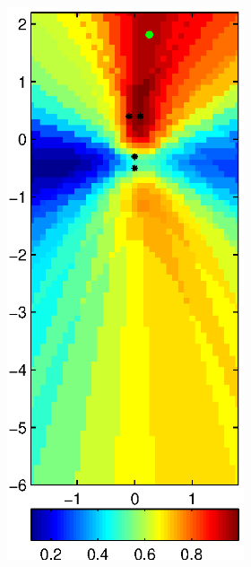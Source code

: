 \documentclass[spanish,openright]{book}
\begin{document}
\begin{figure}
\begin{subfigure}[t]{0.47\textwidth}
\begin{minipage}[t]{\textwidth}
\begin{subfigure}[t]{0.3\textwidth}
\label{fig:SRP_pos08}
\end{subfigure}
\begin{subfigure}[t]{0.3\textwidth}
\includegraphics[width=\textwidth]{SRP_Fo1500_mean_pos08}

\end{subfigure}
\end{minipage}
\end{subfigure}
\end{figure}
\end{document}
